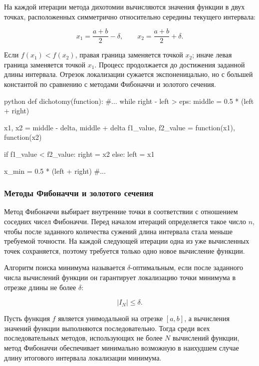 На каждой итерации метода дихотомии вычисляются значения функции в двух точках,
расположенных симметрично относительно середины текущего интервала:

\begin{equation}
x_1 = \frac{a+b}{2} - \delta, \qquad
x_2 = \frac{a+b}{2} + \delta.
\end{equation}

Если $f(x_1) < f(x_2)$, правая граница заменяется точкой $x_2$; иначе левая
граница заменяется точкой $x_1$. Процесс продолжается до достижения
заданной длины интервала. Отрезок локализации сужается
экспоненицально, но с большей константой по сравнению с методами Фибоначчи и золотого сечения.

\begin{mintedbox}{python}
def dichotomy(function):
    #...
    while right - left > eps:
        middle = 0.5 * (left + right)

        x1, x2 = middle - delta, middle + delta
        f1_value, f2_value = function(x1), function(x2)

        if f1_value < f2_value:
            right = x2
        else:
            left = x1
    
    x_min = 0.5 * (left + right)
    #...
\end{mintedbox}

\subsubsection{Методы Фибоначчи и золотого сечения}

Метод Фибоначчи выбирает внутренние точки в соответствии с отношением соседних
чисел Фибоначчи. Перед началом итераций определяется такое число $n$, чтобы
после заданного количества сужений длина интервала стала меньше требуемой
точности. На каждой следующей итерации одна из уже вычисленных точек сохраняется,
поэтому требуется только одно новое вычисление функции. 

\begin{definition}
Алгоритм поиска минимума называется $\delta$-оптимальным, если после
заданного числа вычислений функции он гарантирует локализацию точки
минимума в отрезке длины не более $\delta$:

\[
|I_N| \leq \delta.
\]
\end{definition}

\begin{theorem}
Пусть функция $f$ является унимодальной на отрезке $[a,b]$, а вычисления
значений функции выполняются последовательно. Тогда среди всех
последовательных методов, использующих не более $N$ вычислений функции,
метод Фибоначчи обеспечивает минимально возможную в наихудшем случае
длину итогового интервала локализации минимума.
\end{theorem}


